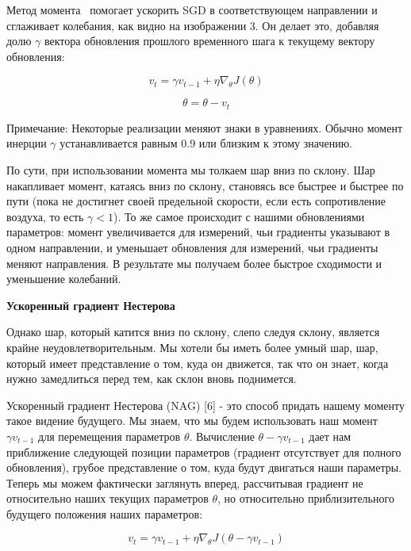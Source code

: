 Метод момента~\cite{QIAN1999145} помогает ускорить
SGD в соответствующем направлении
и сглаживает колебания, как видно на изображении 3.
Он делает это, добавляя долю $\gamma$ вектора обновления прошлого
временного шага к текущему вектору обновления:

\begin{equation*}
    v_t = \gamma v_{t-1} + \eta \nabla_{\theta} J(\theta)
\end{equation*}

\begin{equation*}
    \theta = \theta - v_t
\end{equation*}

Примечание: Некоторые реализации меняют знаки в уравнениях.
Обычно момент инерции $\gamma$ устанавливается равным 0.9
или близким к этому значению.

По сути, при использовании момента мы толкаем шар вниз по склону.
Шар накапливает момент, катаясь вниз по склону,
становясь все быстрее и быстрее по пути
(пока не достигнет своей предельной скорости,
если есть сопротивление воздуха, то есть $\gamma < 1$).
То же самое происходит с нашими обновлениями параметров:
момент увеличивается для измерений, чьи градиенты указывают
в одном направлении, и уменьшает обновления для измерений,
чьи градиенты меняют направления.
В результате мы получаем более быстрое
сходимости и уменьшение колебаний.

\textbf{Ускоренный градиент Нестерова}

Однако шар, который катится вниз по склону, слепо следуя склону,
является крайне неудовлетворительным.
Мы хотели бы иметь более умный шар, шар, который имеет
представление о том, куда он движется, так что он знает,
когда нужно замедлиться перед тем, как склон вновь поднимется.

Ускоренный градиент Нестерова (NAG) [6] - это способ придать
нашему моменту такое видение будущего.
Мы знаем, что мы будем использовать наш момент
$\gamma v_{t-1}$ для перемещения параметров $\theta$.
Вычисление $\theta - \gamma v_{t-1}$ дает нам приближение
следующей позиции параметров
(градиент отсутствует для полного обновления),
грубое представление о том, куда будут двигаться наши параметры.
Теперь мы можем фактически заглянуть вперед,
рассчитывая градиент не относительно наших текущих параметров
$\theta$, но относительно приблизительного
будущего положения наших параметров:

\begin{equation*}
v_t = \gamma v_{t-1} + \eta \nabla_{\theta} J(\theta - \gamma v_{t-1})
\end{equation*}


